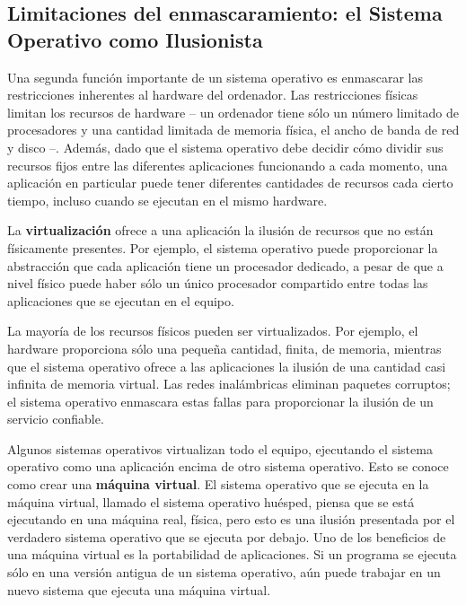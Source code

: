 \documentclass[10pt]{book}
\begin{document}
\subsection{Limitaciones del enmascaramiento: el Sistema Operativo como Ilusionista}
Una segunda función importante de un sistema operativo es enmascarar las restricciones inherentes al hardware del ordenador. Las restricciones físicas limitan los recursos de hardware -- un ordenador tiene sólo un número limitado de procesadores y una cantidad limitada de memoria física, el ancho de banda de red y disco --. Además, dado que el sistema operativo debe decidir cómo dividir sus recursos fijos entre las diferentes aplicaciones funcionando a cada momento, una aplicación en particular puede tener diferentes cantidades de recursos cada cierto tiempo, incluso cuando se ejecutan en el mismo hardware.

La \textbf{virtualización} ofrece a una aplicación la ilusión de recursos que no están físicamente presentes. Por ejemplo, el sistema operativo puede proporcionar la abstracción que cada aplicación tiene un procesador dedicado, a pesar de que a nivel físico puede haber sólo un único procesador compartido entre todas las aplicaciones que se ejecutan en el equipo.

La mayoría de los recursos físicos pueden ser virtualizados. Por ejemplo, el hardware proporciona sólo una pequeña cantidad, finita, de memoria, mientras que el sistema operativo ofrece a las aplicaciones la ilusión de una cantidad casi infinita de memoria virtual. Las redes inalámbricas eliminan paquetes corruptos; el sistema operativo enmascara estas fallas para proporcionar la ilusión de un servicio confiable.

Algunos sistemas operativos virtualizan todo el equipo, ejecutando el sistema operativo como una aplicación encima de otro sistema operativo. Esto se conoce como crear una \textbf{máquina virtual}. El sistema operativo que se ejecuta en la máquina virtual, llamado el sistema operativo huésped, piensa que se está ejecutando en una máquina real, física, pero esto es una ilusión presentada por el verdadero sistema operativo que se ejecuta por debajo. Uno de los beneficios de una máquina virtual es la portabilidad de aplicaciones. Si un programa se ejecuta sólo en una versión antigua de un sistema operativo, aún puede trabajar en un nuevo sistema que ejecuta una máquina virtual.
\end{document}
